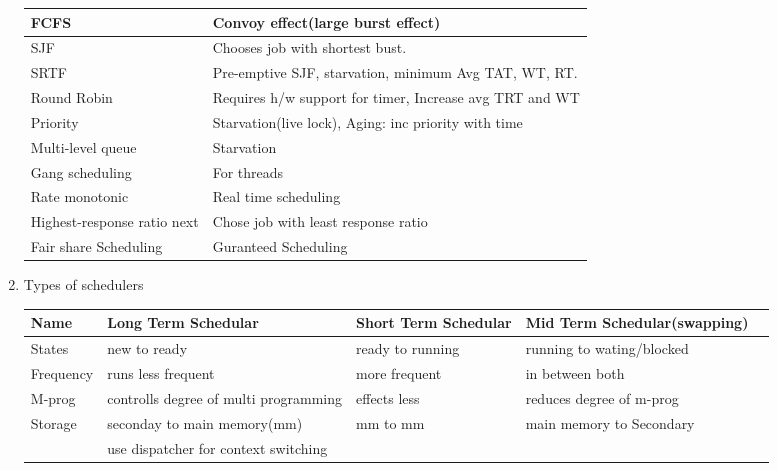 \begin{enumerate}
  \begin{myTableStyle}
    \begin{tabular}{ |l|l| } \hline
        FCFS                &     Convoy effect(large burst effect)                             \\ \hline
        SJF                 &     Chooses job with shortest bust.                               \\ \hline
        SRTF                &     Pre-emptive SJF, starvation, minimum Avg TAT, WT, RT.         \\ \hline
        Round Robin         &     Requires h/w support for timer, Increase avg TRT and WT       \\ \hline
        Priority            &     Starvation(live lock), Aging: inc priority with time         \\ \hline
        Multi-level queue   &     Starvation                                                    \\ \hline
        Gang scheduling     &     For threads                                                    \\ \hline
        Rate monotonic      &     Real time scheduling                                          \\ \hline
        Highest-response ratio next & Chose job with least response ratio                       \\ \hline
        Fair share Scheduling & Guranteed Scheduling                                            \\ \hline
    \end{tabular}
  \end{myTableStyle}

  \item Types of schedulers \\
  \begin{myTableStyle}
    \begin{tabular}{ |l|l|l|l|l| } \hline
        Name      & Long Term Schedular                   & Short Term Schedular  & Mid Term Schedular(swapping)\\ \hline
        States    & new to ready                          & ready to running      & running to wating/blocked   \\ \hline
        Frequency & runs less frequent                    & more frequent         & in between both             \\ \hline
        M-prog    & controlls degree of multi programming & effects less          & reduces degree of m-prog    \\ \hline
        Storage   & seconday to main memory(mm)           & mm to mm              & main memory to Secondary    \\ \hline
                  & use dispatcher for context switching  & &                                                   \\ \hline
    \end{tabular}
  \end{myTableStyle}



\end{enumerate}
